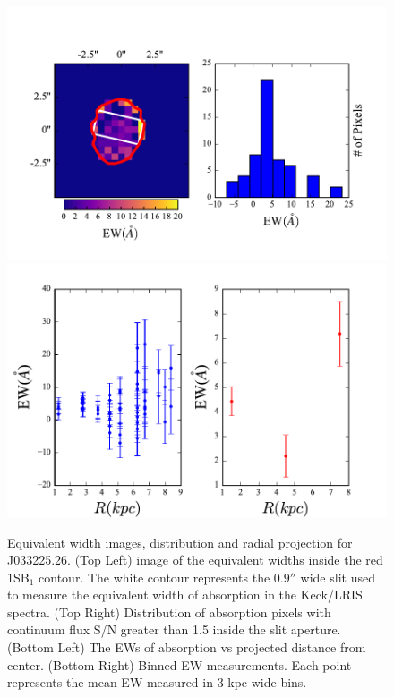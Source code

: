 \documentclass[twocolumn]{aastex61}
\begin{document}
 \begin{figure}[]
\centering
\includegraphics[scale=0.9]{../Figures/J26EW.pdf}
\includegraphics[scale=0.9]{../Figures/J26EW_2.pdf}
\caption{Equivalent width images, distribution and radial projection for J033225.26. (Top Left) image of the  equivalent widths inside the red 1SB$_1$ contour. The white contour represents the $0.9''$ wide  slit used to measure the equivalent width of absorption in the Keck/LRIS spectra.  (Top Right) Distribution of absorption pixels with continuum flux S/N greater than 1.5 inside the slit aperture. (Bottom Left) The EWs of absorption vs projected distance from center. (Bottom Right) Binned EW measurements. Each point represents the mean EW measured in 3 kpc wide bins.}
\label{fig:ew11}
\end{figure}
\end{document}
